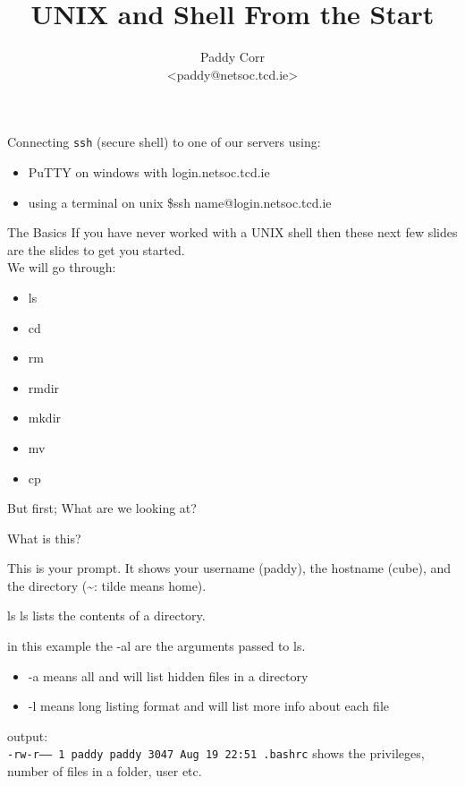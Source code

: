 \documentclass{beamer}
\title{UNIX and Shell From the Start}
\author{Paddy Corr\\\textless paddy@netsoc.tcd.ie\textgreater}
\begin{document}
\begin{frame}[plain]
  \titlepage
\end{frame}

\begin{frame}{Connecting}
\texttt{ssh} (secure shell) to one of our servers using:

\begin{itemize}
    \item PuTTY on windows with login.netsoc.tcd.ie
    \item using a terminal on unix \$ssh name@login.netsoc.tcd.ie
\end{itemize}


\end{frame}

\begin{frame}{The Basics}
If you have never worked with a UNIX shell then these next few slides are the slides to get you started.\\We will go through:
\begin{itemize}
    \item ls
    \item cd
    \item rm
    \item rmdir
    \item mkdir
    \item mv
    \item cp
\end{itemize}
But first; What are we looking at?
\end{frame}

\begin{frame}{What is this?}
\begin{center}
\end{center}

This is your prompt. It shows your username (paddy), the hostname (cube), and the directory (\textasciitilde   : tilde means home).


\end{frame}

\begin{frame}{ls}
ls lists the contents of a directory. 
\begin{center}
\end{center}
in this example the -al are the arguments passed to ls.
\begin{itemize}
    \item -a means all and will list hidden files in a directory
    \item -l means long listing format and will list more info about each file
\end{itemize}
output:\\
\texttt{-rw-r-----   1 paddy paddy   3047 Aug 19 22:51 .bashrc}
shows the privileges, number of files in a folder, user etc.
\end{frame}
\end{document}
